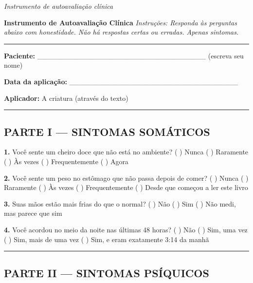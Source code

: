 
\noindent \textit{Instrumento de autoavaliação clínica}

\noindent \textbf{Instrumento de Autoavaliação Clínica}
\textit{Instruções: Responda às perguntas abaixo com honestidade. Não há respostas certas ou erradas. Apenas sintomas.}

\vspace{0.5em}\noindent\rule{\textwidth}{0.5pt}\vspace{0.5em}

\noindent \textbf{Paciente:} \_\_\_\_\_\_\_\_\_\_\_\_\_\_\_\_\_\_\_\_\_\_\_\_\_\_\_\_\_\_\_\_\_ (escreva seu nome)

\noindent \textbf{Data da aplicação:} \_\_\_\_\_\_\_\_\_\_\_\_\_\_\_\_\_\_\_\_\_\_\_\_\_\_\_\_\_\_\_\_\_

\noindent \textbf{Aplicador:} A criatura (através do texto)

\vspace{0.5em}\noindent\rule{\textwidth}{0.5pt}\vspace{0.5em}

\subsection*{PARTE I --- SINTOMAS SOMÁTICOS}

\noindent \textbf{1.} Você sente um cheiro doce que não está no ambiente?
( ) Nunca
( ) Raramente
( ) Às vezes
( ) Frequentemente
( ) Agora

\noindent \textbf{2.} Você sente um peso no estômago que não passa depois de comer?
( ) Nunca
( ) Raramente
( ) Às vezes
( ) Frequentemente
( ) Desde que começou a ler este livro

\noindent \textbf{3.} Suas mãos estão mais frias do que o normal?
( ) Não
( ) Sim
( ) Não medi, mas parece que sim

\noindent \textbf{4.} Você acordou no meio da noite nas últimas 48 horas?
( ) Não
( ) Sim, uma vez
( ) Sim, mais de uma vez
( ) Sim, e eram exatamente 3:14 da manhã

\vspace{0.5em}\noindent\rule{\textwidth}{0.5pt}\vspace{0.5em}

\subsection*{PARTE II --- SINTOMAS PSÍQUICOS}

